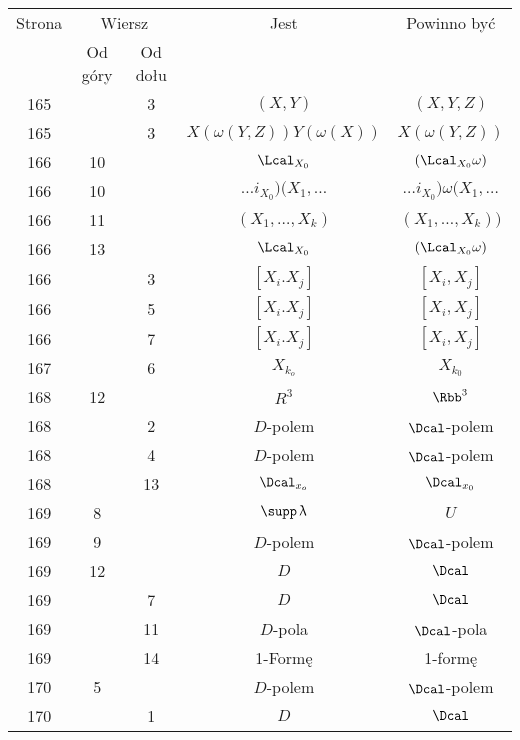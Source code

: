 \documentclass[a4paper,11pt]{article}
\numberwithin{equation}{section}
\renewcommand{\lambda}{\uplambda}
\begin{document}
\begin{center}
  \begin{tabular}{|c|c|c|c|c|}
    \hline
    Strona & \multicolumn{2}{c|}{Wiersz} & Jest
                              & Powinno być \\ \cline{2-3}
    & Od góry & Od dołu & & \\
    \hline
    165 & & \hphantom{0}3 & $( X, Y )$ & $( X, Y, Z )$ \\
    165 & & \hphantom{0}3 & $X( \omega( Y, Z ) ) Y( \omega( X ) )$
           & $X( \omega( Y, Z ) )$ \\
    166 & 10 & & $\Lcal_{ { X_{ 0 } } }$ & $( \Lcal_{ { X_{ 0 } } } \omega )$ \\
    166 & 10 & & $\ldots i_{ { X_{ 0 } } } ) ( X_{ 1 }, \ldots$
           & $\ldots i_{ { X_{ 0 } } } ) \omega( X_{ 1 }, \ldots$ \\
    166 & 11 & & $( X_{ 1 }, \ldots, X_{ k } )$
           & $( X_{ 1 }, \ldots, X_{ k } ))$ \\
    166 & 13 & & $\Lcal_{ { X_{ 0 } } }$
    & $( \Lcal_{ { X_{ 0 } } } \omega )$ \\
    166 & & \hphantom{0}3 & $[ X_{ i }. X_{ j } ]$ & $[ X_{ i }, X_{ j } ]$ \\
    166 & & \hphantom{0}5 & $[ X_{ i }. X_{ j } ]$ & $[ X_{ i }, X_{ j } ]$ \\
    166 & & \hphantom{0}7 & $[ X_{ i }. X_{ j } ]$ & $[ X_{ i }, X_{ j } ]$ \\
    167 & & \hphantom{0}6 & $X_{ k_{ o } }$ & $X_{ k_{ 0 } }$ \\
    168 & 12 & & $R^{ 3 }$ & $\Rbb^{ 3 }$ \\
    168 & & \hphantom{0}2 & $D$-polem & $\Dcal$-polem \\
    168 & & \hphantom{0}4 & $D$-polem & $\Dcal$-polem \\
    168 & & 13 & $\Dcal_{ x_{ o } }$ & $\Dcal_{ x_{ 0 } }$ \\
    169 & \hphantom{0}8 & & $\supp\, \lambda$ & $U$ \\
    169 & \hphantom{0}9 & & $D$-polem & $\Dcal$-polem \\
    169 & 12 & & $D$ & $\Dcal$ \\
    169 & & \hphantom{0}7 & $D$ & $\Dcal$ \\
    169 & & 11 & $D$-pola & $\Dcal$-pola \\
    169 & & 14 & 1-Formę & 1-formę \\
    170 & \hphantom{0}5 & & $D$-polem & $\Dcal$-polem  \\
    170 & & \hphantom{0}1 & $D$ & $\Dcal$ \\

\end{tabular}
\end{center}
\end{document}
